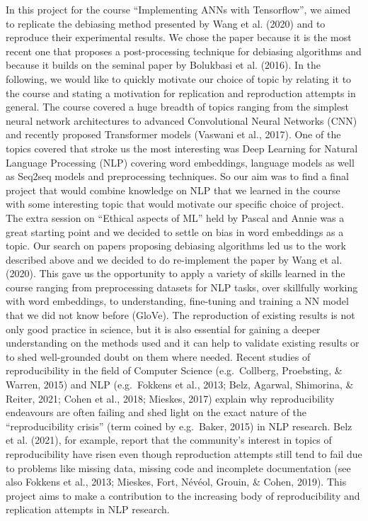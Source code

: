 \documentclass[
  english,
  man,floatsintext]{apa6}
\begin{document}
In this project for the course \enquote{Implementing ANNs with Tensorflow}, we aimed to replicate the debiasing method presented by Wang et al. (2020) and to reproduce their experimental results. We chose the paper because it is the most recent one that proposes a post-processing technique for debiasing algorithms and because it builds on the seminal paper by Bolukbasi et al. (2016).
In the following, we would like to quickly motivate our choice of topic by relating it to the course and stating a motivation for replication and reproduction attempts in general.
The course covered a huge breadth of topics ranging from the simplest neural network architectures to advanced Convolutional Neural Networks (CNN) and recently proposed Transformer models (Vaswani et al., 2017). One of the topics covered that stroke us the most interesting was Deep Learning for Natural Language Processing (NLP) covering word embeddings, language models as well as Seq2seq models and preprocessing techniques. So our aim was to find a final project that would combine knowledge on NLP that we learned in the course with some interesting topic that would motivate our specific choice of project. The extra session on \enquote{Ethical aspects of ML} held by Pascal and Annie was a great starting point and we decided to settle on bias in word embeddings as a topic. Our search on papers proposing debiasing algorithms led us to the work described above and we decided to do re-implement the paper by Wang et al. (2020). This gave us the opportunity to apply a variety of skills learned in the course ranging from preprocessing datasets for NLP tasks, over skillfully working with word embeddings, to understanding, fine-tuning and training a NN model that we did not know before (GloVe).
The reproduction of existing results is not only good practice in science, but it is also essential for gaining a deeper understanding on the methods used and it can help to validate existing results or to shed well-grounded doubt on them where needed. Recent studies of reproducibility in the field of Computer Science (e.g.~Collberg, Proebsting, \& Warren, 2015) and NLP (e.g.~Fokkens et al., 2013; Belz, Agarwal, Shimorina, \& Reiter, 2021; Cohen et al., 2018; Mieskes, 2017) explain why reproducibility endeavours are often failing and shed light on the exact nature of the \enquote{reproducibility crisis} (term coined by e.g.~Baker, 2015) in NLP research. Belz et al. (2021), for example, report that the community's interest in topics of reproducibility have risen even though reproduction attempts still tend to fail due to problems like missing data, missing code and incomplete documentation (see also Fokkens et al., 2013; Mieskes, Fort, Névéol, Grouin, \& Cohen, 2019).
This project aims to make a contribution to the increasing body of reproducibility and replication attempts in NLP research.
\end{document}
